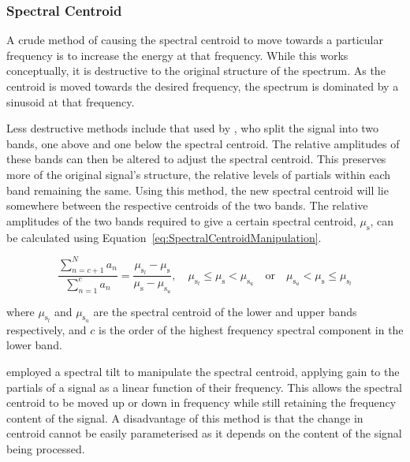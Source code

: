 		\subsubsection*{Spectral Centroid}
			A crude method of causing the spectral centroid to move towards a particular frequency is to
			increase the energy at that frequency. While this works conceptually, it is destructive to the
			original structure of the spectrum. As the centroid is moved towards the desired frequency, the
			spectrum is dominated by a sinusoid at that frequency.

			Less destructive methods include that used by \citet{zacharakis2011an}, who split the signal into
			two bands, one above and one below the spectral centroid. The relative amplitudes of these bands
			can then be altered to adjust the spectral centroid. This preserves more of the original signal's
			structure, the relative levels of partials within each band remaining the same. Using this method,
			the new spectral centroid will lie somewhere between the respective centroids of the two bands. The
			relative amplitudes of the two bands required to give a certain spectral centroid,
			$\mu_{\mathrm{s}}$, can be calculated using Equation~\ref{eq:SpectralCentroidManipulation}.

			\begin{equation}
				\frac{\sum_{n = c + 1}^{N} a_{n}}
				     {{\sum_{n = 1}^{c} a_{n}}} = 
				\frac{\mu_{\mathrm{s}_{l}} - \mu_{\mathrm{s}}}{\mu_{\mathrm{s}} - \mu_{\mathrm{s}_{u}}}, 
				\quad \mu_{\mathrm{s}_{l}} \leq \mu_{\mathrm{s}} < \mu_{\mathrm{s}_{u}} \quad \text{or} 
					\quad \mu_{\mathrm{s}_{u}} < \mu_{\mathrm{s}} \leq \mu_{\mathrm{s}_{l}}
				\label{eq:SpectralCentroidManipulation}
			\end{equation}

			where $\mu_{\mathrm{s}_{l}}$ and $\mu_{\mathrm{s}_{u}}$ are the spectral centroid of the lower and
			upper bands respectively, and $c$ is the order of the highest frequency spectral component in the
			lower band.

			\citet{williams2007perceptually} employed a spectral tilt to manipulate the spectral centroid,
			applying gain to the partials of a signal as a linear function of their frequency. This allows the
			spectral centroid to be moved up or down in frequency while still retaining the frequency content
			of the signal. A disadvantage of this method is that the change in centroid cannot be easily
			parameterised as it depends on the content of the signal being processed.

